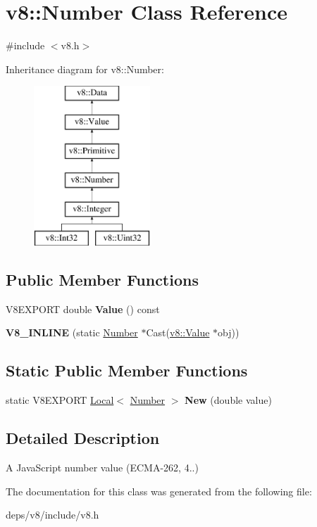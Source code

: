 \hypertarget{classv8_1_1_number}{}\section{v8\+:\+:Number Class Reference}
\label{classv8_1_1_number}


{\ttfamily \#include $<$v8.\+h$>$}

Inheritance diagram for v8\+:\+:Number\+:\begin{figure}[H]
\begin{center}
\leavevmode
\includegraphics[height=6.000000cm]{classv8_1_1_number}
\end{center}
\end{figure}
\subsection*{Public Member Functions}
\begin{DoxyCompactItemize}
\item 
\hypertarget{classv8_1_1_number_a98717c8d0e7731e2ba57d2ccfbe62697}{}V8\+E\+X\+P\+O\+R\+T double {\bfseries Value} () const \label{classv8_1_1_number_a98717c8d0e7731e2ba57d2ccfbe62697}

\item 
\hypertarget{classv8_1_1_number_a686da7d346857e08b605c293ad79600d}{}{\bfseries V8\+\_\+\+I\+N\+L\+I\+N\+E} (static \hyperlink{classv8_1_1_number}{Number} $\ast$Cast(\hyperlink{classv8_1_1_value}{v8\+::\+Value} $\ast$obj))\label{classv8_1_1_number_a686da7d346857e08b605c293ad79600d}

\end{DoxyCompactItemize}
\subsection*{Static Public Member Functions}
\begin{DoxyCompactItemize}
\item 
\hypertarget{classv8_1_1_number_a527a9e071536ca2cf57ce2eabea0bf36}{}static V8\+E\+X\+P\+O\+R\+T \hyperlink{classv8_1_1_local}{Local}$<$ \hyperlink{classv8_1_1_number}{Number} $>$ {\bfseries New} (double value)\label{classv8_1_1_number_a527a9e071536ca2cf57ce2eabea0bf36}

\end{DoxyCompactItemize}


\subsection{Detailed Description}
A Java\+Script number value (E\+C\+M\+A-\/262, 4..) 

The documentation for this class was generated from the following file\+:\begin{DoxyCompactItemize}
\item 
deps/v8/include/v8.\+h\end{DoxyCompactItemize}
